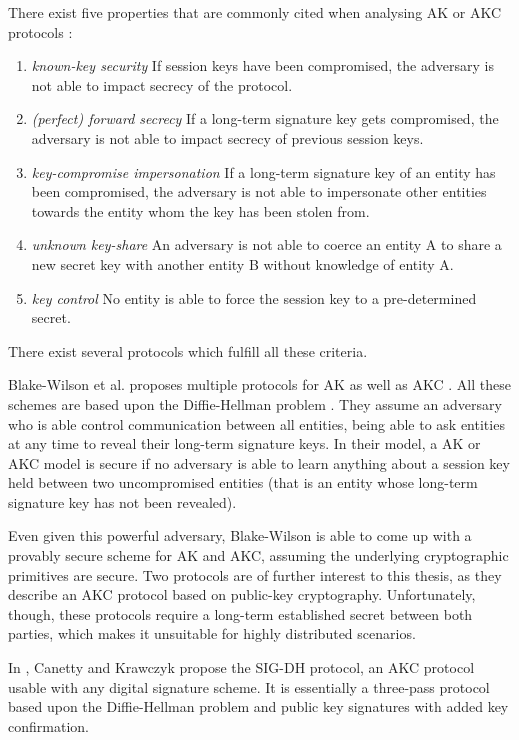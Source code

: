 There exist five properties that are commonly cited when analysing AK or AKC protocols \cite{menezes1996handbook,blake1997key,law2003efficient}:
\begin{enumerate}
    \item \emph{known-key security}
        If session keys have been compromised, the adversary is not able to impact secrecy of the protocol.
    \item \emph{(perfect) forward secrecy}
        If a long-term signature key gets compromised, the adversary is not able to impact secrecy of previous session keys.
    \item \emph{key-compromise impersonation}
        If a long-term signature key of an entity has been compromised, the adversary is not able to impersonate other entities towards the entity whom the key has been stolen from.
    \item \emph{unknown key-share}
        An adversary is not able to coerce an entity A to share a new secret key with another entity B without knowledge of entity A.
    \item \emph{key control}
        No entity is able to force the session key to a pre-determined secret.
\end{enumerate}
There exist several protocols which fulfill all these criteria.

Blake-Wilson et al. proposes multiple protocols for AK as well as AKC \cite{blake1997key}.
All these schemes are based upon the Diffie-Hellman problem \cite{diffie1976new}.
They assume an adversary who is able control communication between all entities, being able to ask entities at any time to reveal their long-term signature keys.
In their model, a AK or AKC model is secure if no adversary is able to learn anything about a session key held between two uncompromised entities (that is an entity whose long-term signature key has not been revealed).

Even given this powerful adversary, Blake-Wilson is able to come up with a provably secure scheme for AK and AKC, assuming the underlying cryptographic primitives are secure.
Two protocols are of further interest to this thesis, as they describe an AKC protocol based on public-key cryptography.
Unfortunately, though, these protocols require a long-term established secret between both parties, which makes it unsuitable for highly distributed scenarios.

In \cite{canetti2001analysis}, Canetty and Krawczyk propose the SIG-DH protocol, an AKC protocol usable with any digital signature scheme.
It is essentially a three-pass protocol based upon the Diffie-Hellman problem and public key signatures with added key confirmation.

